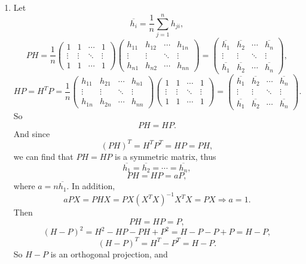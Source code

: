 \documentclass[11pt,a4paper]{article}
\begin{document}
\subsection{}
\begin{enumerate}[label=\roman*)]
\item
Let $$\overline{h_i}=\frac{1}{n}\sum_{j=1}^nh_{ji},$$
$$PH=\frac{1}{n}\begin{pmatrix}
1 & 1 & \cdots & 1 \\
\vdots & \vdots & \ddots & \vdots \\
1 & 1 & \cdots & 1 
\end{pmatrix}\begin{pmatrix}
h_{11} & h_{12} & \cdots & h_{1n} \\
\vdots & \vdots & \ddots & \vdots \\
h_{n1} & h_{n2} & \cdots & h_{nn} 
\end{pmatrix}=\begin{pmatrix}
\overline{h_1} & \overline{h_2} & \cdots & \overline{h_n} \\
\vdots & \vdots & \ddots & \vdots \\
\overline{h_1} & \overline{h_2} & \cdots & \overline{h_n} 
\end{pmatrix},$$
$$HP=H^TP=\frac{1}{n}\begin{pmatrix}
h_{11} & h_{21} & \cdots & h_{n1} \\
\vdots & \vdots & \ddots & \vdots \\
h_{1n} & h_{2n} & \cdots & h_{nn} 
\end{pmatrix}\begin{pmatrix}
1 & 1 & \cdots & 1 \\
\vdots & \vdots & \ddots & \vdots \\
1 & 1 & \cdots & 1 
\end{pmatrix}=\begin{pmatrix}
\overline{h_1} & \overline{h_2} & \cdots & \overline{h_n} \\
\vdots & \vdots & \ddots & \vdots \\
\overline{h_1} & \overline{h_2} & \cdots & \overline{h_n} 
\end{pmatrix}.$$
So $$PH=HP.$$
And since
$$(PH)^T=H^TP^T=HP=PH,$$
we can find that $PH=HP$ is a symmetric matrix, thus
$$\overline{h_1}=\overline{h_2}=\cdots=\overline{h_n},$$
$$PH=HP=aP,$$
where $a=n\overline{h_1}.$
In addition,
$$aPX=PHX=PX(X^TX)^{-1}X^TX=PX\Longrightarrow a=1.$$
Then
$$PH=HP=P,$$
$$(H-P)^2=H^2-HP-PH+P^2=H-P-P+P=H-P,$$
$$(H-P)^T=H^T-P^T=H-P.$$
So $H-P$ is an orthogonal projection, and

\end{enumerate}
\end{document}
